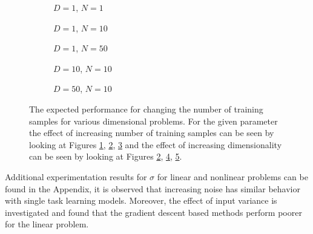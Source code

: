 \begin{figure}[!h]
  \centering
    \begin{subfigure}{0.33\textwidth}
      \centering
      \caption{$D=1$, $N=1$}
      \label{fig:nonlinear-c2-N-1-D-1}
    \end{subfigure}
    \begin{subfigure}{0.33\textwidth}
      \centering
      \caption{$D=1$, $N=10$}
      \label{fig:nonlinear-c2-N-10-D-1}
    \end{subfigure}
    \begin{subfigure}{0.33\textwidth}
      \centering
      \caption{$D=1$, $N=50$}
      \label{fig:nonlinear-c2-N-50-D-1}
    \end{subfigure}

    \begin{subfigure}{0.33\textwidth}
      \centering
      \caption{$D=10$, $N=10$}
      \label{fig:nonlinear-c2-N-10-D-10}
    \end{subfigure}
    \begin{subfigure}{0.33\textwidth}
      \centering
      \caption{$D=50$, $N=10$}
      \label{fig:nonlinear-c2-N-10-D-50}
    \end{subfigure}  

  \caption{The expected performance for changing the number of training samples for various dimensional problems. For the given parameter the effect of increasing number of training samples can be seen by looking at Figures \ref{fig:nonlinear-c2-N-1-D-1}, \ref{fig:nonlinear-c2-N-10-D-1}, \ref{fig:nonlinear-c2-N-50-D-1} and the effect of increasing dimensionality can be seen by looking at Figures \ref{fig:nonlinear-c2-N-10-D-1}, \ref{fig:nonlinear-c2-N-10-D-10}, \ref{fig:nonlinear-c2-N-10-D-50}.}\label{fig:nonlinear-c2}
\end{figure}

Additional experimentation results for $\sigma$ for linear and nonlinear problems can be found in the Appendix, it is observed that increasing noise has similar behavior with single task learning models. Moreover, the effect of input variance is investigated and found that the gradient descent based methods perform poorer for the linear problem. 


